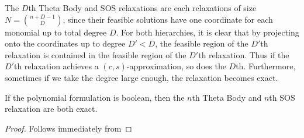 The $D$th Theta Body and SOS relaxations are each relaxations of size $N = \binom{n+D-1}{D}$, since their feasible solutions have one coordinate for each monomial up to total degree $D$. For both hierarchies, it is clear that by projecting onto the coordinates up to degree $D' < D$, the feasible region of the $D'$th relaxation is contained in the feasible region of the $D'$th relaxation. Thus if the $D'$th relaxation achieves a $(c,s)$-approximation, so does the $D$th. Furthermore, sometimes if we take the degree large enough, the relaxation becomes exact.
\begin{lemma}
If the polynomial formulation is boolean, then the $n$th Theta Body and $n$th SOS relaxation are both exact.
\end{lemma}
\begin{proof}
Follows immediately from 
\end{proof}

